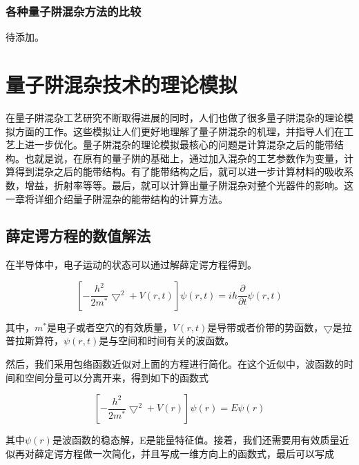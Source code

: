 \documentclass{ZJUthesis}
\begin{document}
\subsection{各种量子阱混杂方法的比较}

待添加。

\chapter{量子阱混杂技术的理论模拟}

在量子阱混杂工艺研究不断取得进展的同时，人们也做了很多量子阱混杂的理论模拟方面的工作。这些模拟让人们更好地理解了量子阱混杂的机理，并指导人们在工艺上进一步优化。量子阱混杂的理论模拟最核心的问题是计算混杂之后的能带结构。也就是说，在原有的量子阱的基础上，通过加入混杂的工艺参数作为变量，计算得到混杂之后的能带结构。有了能带结构之后，就可以进一步计算材料的吸收系数，增益，折射率等等。最后，就可以计算出量子阱混杂对整个光器件的影响。这一章将详细介绍量子阱混杂的能带结构的计算方法。

\section{薛定谔方程的数值解法}

在半导体中，电子运动的状态可以通过解薛定谔方程得到。

\begin{equation}
    \label{schrodinger}
    \left[ -\frac{h^2}{ 2m^*} \bigtriangledown ^2 + V(r,t) \right] \psi(r,t) = ih \frac{\partial}{\partial t}  \psi(r,t) 
\end{equation}

其中，$m^*$是电子或者空穴的有效质量，$V(r,t)$是导带或者价带的势函数，$\bigtriangledown$是拉普拉斯算符，$\psi(r,t)$是与空间和时间有关的波函数。

然后，我们采用包络函数近似对上面的方程进行简化。在这个近似中，波函数的时间和空间分量可以分离开来，得到如下的函数式

\begin{equation}
    \label{schrodinger2}
    \left[ -\frac{h^2}{ 2m^*} \bigtriangledown ^2 + V(r) \right] \psi(r) = E  \psi(r) 
\end{equation}

其中$\psi(r)$是波函数的稳态解，E是能量特征值。接着，我们还需要用有效质量近似再对薛定谔方程做一次简化，并且写成一维方向上的函数式，最后可以写成
\end{document}
